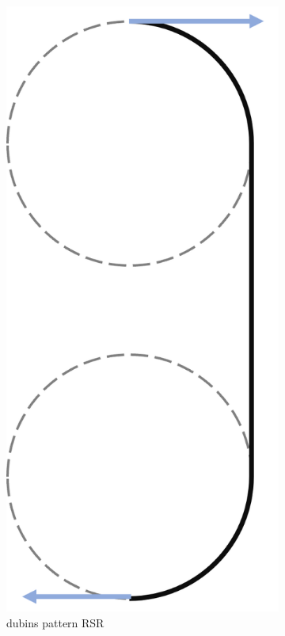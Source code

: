 \begin{figure}
\begin{subfigure}[b]{0.2\textwidth}
         \includegraphics[scale=0.7]{fig/dubins/RSR.png}
         \caption{dubins pattern RSR}
         \label{fig:dubins pattern RSR}
     \end{subfigure}
     \hfill
     \begin{subfigure}[b]{0.2\textwidth}

\end{subfigure}
\end{figure}
